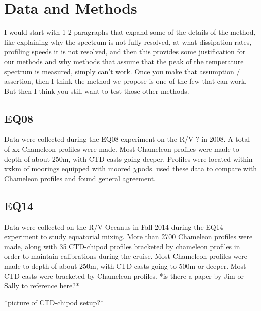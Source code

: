 \documentclass{ametsoc}
\begin{document}
\section{Data and Methods}

I would start with 1-2 paragraphs that expand some of the details of the method, like explaining why the spectrum is not fully resolved, at what dissipation rates, profiling speeds it is not resolved, and then this provides some justification for our methods and why methods that assume that the peak of the temperature spectrum is measured, simply can't work.  Once you make that assumption / assertion, then I think the method we propose is one of the few that can work.  But then I think you still want to test those other methods.   
 
\subsection{EQ08}

Data were collected during the EQ08 experiment on the R/V ? in 2008.  A total of xx Chameleon profiles were made. Most Chameleon profiles were made to depth of about 250m, with CTD casts going deeper. Profiles were located within xxkm of moorings equipped with moored $\chi$pods. \cite{perlinmoum12} used these data to compare with Chameleon profiles and found general agreement. 

\subsection{EQ14}

Data were collected on the R/V Oceanus in Fall 2014 during the EQ14 experiment to study equatorial mixing.  More than 2700 Chameleon profiles were made, along with 35 CTD-chipod profiles bracketed by chameleon profiles in order to maintain calibrations during the cruise. Most Chameleon profiles were made to depth of about 250m, with CTD casts going to 500m or deeper. Most CTD casts were bracketed by Chameleon profiles. *is there a paper by Jim or Sally to reference here?*

*picture of CTD-chipod setup?*
\end{document}
